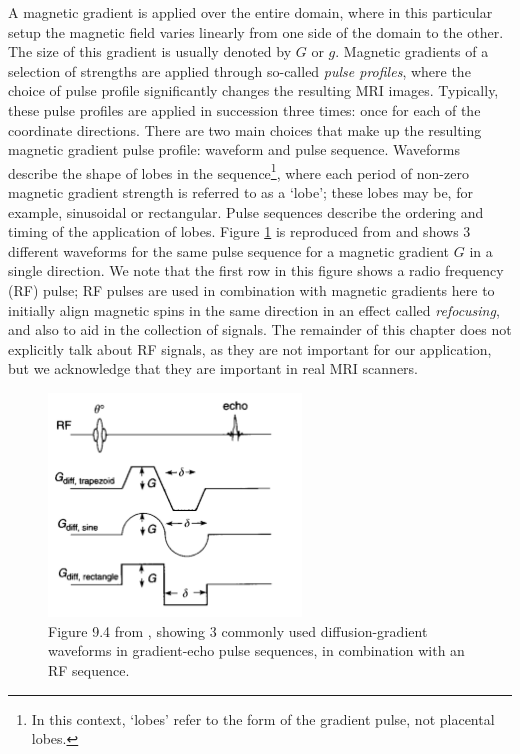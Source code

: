         A magnetic gradient is applied over the entire domain, where in this particular setup the magnetic field varies linearly from one side of the domain to the other. The size of this gradient is usually denoted by $G$ or $g$. Magnetic gradients of a selection of strengths are applied through so-called \textit{pulse profiles}, where the choice of pulse profile significantly changes the resulting MRI images. Typically, these pulse profiles are applied in succession three times: once for each of the coordinate directions. There are two main choices that make up the resulting magnetic gradient pulse profile: waveform and pulse sequence. Waveforms describe the shape of lobes in the sequence\footnote{In this context, `lobes' refer to the form of the gradient pulse, not placental lobes.}, where each period of non-zero magnetic gradient strength is referred to as a `lobe'; these lobes may be, for example, sinusoidal or rectangular. Pulse sequences describe the ordering and timing of the application of lobes. Figure \ref{fig:bernstein_9.4} is reproduced from \cite{bernsteinHandbookMRIPulse2004} and shows 3 different waveforms for the same pulse sequence for a magnetic gradient $G$ in a single direction. We note that the first row in this figure shows a radio frequency (RF) pulse; RF pulses are used in combination with magnetic gradients here to initially align magnetic spins in the same direction in an effect called \textit{refocusing}, and also to aid in the collection of signals. The remainder of this chapter does not explicitly talk about RF signals, as they are not important for our application, but we acknowledge that they are important in real MRI scanners.

        \begin{figure}
            \centering
            \includegraphics[width=0.6\textwidth]{diagrams/other-paper-figures/Bernstein_9.4.png}
            \caption{Figure 9.4 from \cite{bernsteinHandbookMRIPulse2004}, showing 3 commonly used diffusion-gradient waveforms in gradient-echo pulse sequences, in combination with an RF sequence.}
            \label{fig:bernstein_9.4}
        \end{figure}
    
